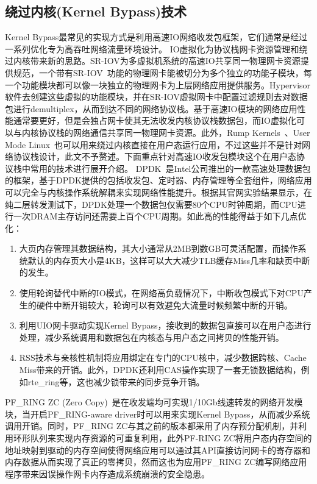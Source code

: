 \subsection{绕过内核(Kernel Bypass)技术}
\label{subsec:02_dpdk}

Kernel Bypass最常见的实现方式是利用高速IO网络收发包框架，它们通常是经过一系列优化专为高吞吐网络流量环境设计。 IO虚拟化为协议栈网卡资源管理和绕过内核带来新的思路。SR-IOV为多虚拟机系统的高速IO共享同一物理网卡资源提供规范，一个带有SR-IOV~\cite{dong2012high}功能的物理网卡能被切分为多个独立的功能子模块，每一个功能模块都可以像一块独立的物理网卡为上层网络应用提供服务。Hypervisor软件去创建这些虚拟的功能模块，并在SR-IOV虚拟网卡中配置过滤规则去对数据包进行demultiplex，从而到达不同的网络协议栈。基于高速IO模块的网络应用性能通常要更好，但是会独占网卡使其无法收发内核协议栈数据包，而IO虚拟化可以与内核协议栈的网络通信共享同一物理网卡资源。此外，Rump Kernels~\cite{kantee2014rump}、User Mode Linux~\cite{dike2001user}也可以用来绕过内核直接在用户态运行应用，不过这些并不是针对网络协议栈设计，此文不予赘述。下面重点针对高速IO收发包模块这个在用户态协议栈中常用的技术进行展开介绍。
DPDK~\cite{DPDK}是Intel公司推出的一款高速处理数据包的框架，基于DPDK提供的包括收发包、定时器、内存管理等全套组件，网络应用可以完全与内核操作系统解耦来实现网络性能提升。根据其官网实验结果显示，在纯二层转发测试下，DPDK处理一个数据包仅需要80个CPU时钟周期，而CPU进行一次DRAM主存访问还需要上百个CPU周期。如此高的性能得益于如下几点优化：

\begin{enumerate}[(1),labelsep=.5em, leftmargin = 0pt, itemindent = 3em]
\item 大页内存管理其数据结构，其大小通常从2MB到数GB可灵活配置，而操作系统默认的内存页大小是4KB，这样可以大大减少TLB缓存Miss几率和缺页中断的发生。
\item 使用轮询替代中断的IO模式，在网络高负载情况下，中断收包模式下对CPU产生的硬件中断开销较大，轮询可以有效避免大流量时候频繁中断的开销。
\item 利用UIO网卡驱动实现Kernel Bypass，接收到的数据包直接可以在用户态进行处理，减少系统调用和数据包在内核态与用户态之间拷贝的性能开销。
\item RSS技术与亲核性机制将应用绑定在专门的CPU核中，减少数据跨核、Cache Miss带来的开销。此外，DPDK还利用CAS操作实现了一套无锁数据结构，例如rte\_ring等，这也减少锁带来的同步竞争开销。
\end{enumerate}

PF\_RING ZC (Zero Copy)~\cite{PF_RING}是在收发端均可实现1/10Gb线速转发的网络开发模块，当开启PF\_RING-aware driver时可以用来实现Kernel Bypass，从而减少系统调用开销。同时，PF\_RING ZC与其之前的版本都采用了内存预分配机制，并利用环形队列来实现内存资源的可重复利用，此外PF-RING ZC将用户态内存空间的地址映射到驱动的内存空间使得网络应用可以通过其API直接访问网卡的寄存器和内存数据从而实现了真正的零拷贝，然而这也为应用PF\_RING ZC编写网络应用程序带来因误操作网卡内存造成系统崩溃的安全隐患。


